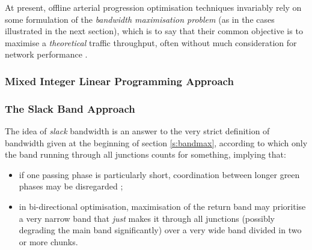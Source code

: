 At present, offline arterial progression optimisation techniques invariably rely on some formulation of the \emph{bandwidth maximisation problem} (as in the cases illustrated in the next section), which is to say that their common objective is to maximise a \emph{theoretical} traffic throughput, often without much consideration for network performance .



\subsubsection*{Mixed Integer Linear Programming Approach}

\subsubsection*{The Slack Band Approach}
The idea of \emph{slack} bandwidth is an answer to the very strict definition of bandwidth given at the beginning of section \ref{s:bandmax}, according to which only the band running through all junctions counts for something, implying that:
\begin{itemize}
\item if one passing phase is particularly short, coordination between longer green phases may be disregarded ;
\item in bi-directional optimisation, maximisation of the return band may prioritise a very narrow band that \emph{just} makes it through all junctions (possibly degrading the main band significantly) over a very wide band divided in two or more chunks.
\end{itemize} 
